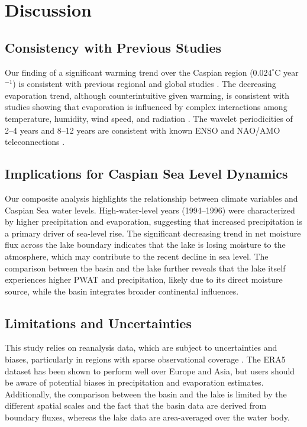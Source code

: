 \documentclass[12pt,a4paper]{article}
\begin{document}
\section{Discussion}

\subsection{Consistency with Previous Studies}
Our finding of a significant warming trend over the Caspian region ($0.024^\circ$C year$^{-1}$) is consistent with previous regional and global studies \citep{shevchenko2017}. The decreasing evaporation trend, although counterintuitive given warming, is consistent with studies showing that evaporation is influenced by complex interactions among temperature, humidity, wind speed, and radiation \citep{donohue2010}. The wavelet periodicities of 2–4 years and 8–12 years are consistent with known ENSO and NAO/AMO teleconnections \citep{arpad2006,kislov2018}.

\subsection{Implications for Caspian Sea Level Dynamics}
Our composite analysis highlights the relationship between climate variables and Caspian Sea water levels. High-water-level years (1994–1996) were characterized by higher precipitation and evaporation, suggesting that increased precipitation is a primary driver of sea-level rise. The significant decreasing trend in net moisture flux across the lake boundary indicates that the lake is losing moisture to the atmosphere, which may contribute to the recent decline in sea level. The comparison between the basin and the lake further reveals that the lake itself experiences higher PWAT and precipitation, likely due to its direct moisture source, while the basin integrates broader continental influences.

\subsection{Limitations and Uncertainties}
This study relies on reanalysis data, which are subject to uncertainties and biases, particularly in regions with sparse observational coverage \citep{hersbach2020}. The ERA5 dataset has been shown to perform well over Europe and Asia, but users should be aware of potential biases in precipitation and evaporation estimates. Additionally, the comparison between the basin and the lake is limited by the different spatial scales and the fact that the basin data are derived from boundary fluxes, whereas the lake data are area-averaged over the water body.
\end{document}
